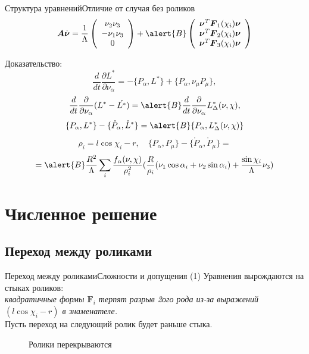 \documentclass{beamer}
\begin{document}
\begin{frame}{Структура уравнений}{Отличие от случая без роликов}    
    $$\boldsymbol{A}\dot{\boldsymbol{\nu}} = \frac1\Lambda
    \left(
    \begin{array}{c}
         \nu_2\nu_3  \\
         -\nu_1\nu_3 \\
         0
    \end{array}
    \right) + \alert{B}
     \left(
    \begin{array}{c}
         \boldsymbol{\nu}^T\boldsymbol{F}_1(\chi_i)\boldsymbol{\nu}  \\
         \boldsymbol{\nu}^T\boldsymbol{F}_2(\chi_i)\boldsymbol{\nu} \\
         \boldsymbol{\nu}^T\boldsymbol{F}_3(\chi_i)\boldsymbol{\nu}
    \end{array}
    \right)
    $$
    
    \textcolor{Periwinkle}{Доказательство:}
  $$ \frac{d}{dt}\frac{\partial L^{*}}{\partial \nu_\alpha} = - \{P_\alpha, L^{*}\} + \{P_\alpha, \nu_\mu P_\mu\},$$
    $$ \frac{d}{dt}\frac{\partial }{\partial \nu_\alpha}(L^{*} - \mathring{L^{*}}) = \alert{B}\frac{d}{dt}\frac{\partial}{\partial \nu_\alpha}L^{*}_\Delta(\nu, \chi), $$
    $$ \{P_\alpha, L^{*}\} - \{\mathring{P}_\alpha, \mathring{L}^{*}\} = \alert{B}\{ P_\alpha, L^{*}_\Delta(\nu, \chi) \} $$
    $$\rho_i = l\cos\chi_i - r, \quad \{P_\alpha, P_\mu\} - \{\mathring{P}_\alpha, \mathring{P}_\mu\}  = $$
    $$ = \alert{B}\frac{R^2}{\Lambda}\sum_i\frac{f_\alpha(\nu, \chi)}{\rho^2_i}(\frac{R}{\rho_i}(\nu_1\cos\alpha_i + \nu_2\sin\alpha_i) + \frac{\sin\chi_i}{\Lambda}\nu_3)$$
\end{frame}

\section{Численное решение}

\subsection{Переход между роликами}

\begin{frame}{Переход между роликами}{Сложности и допущения}
    \textcolor{Periwinkle}{(1) Уравнения вырождаются на стыках роликов:}\\
    \textit{квадратичные формы $\boldsymbol{F}_i$ терпят разрыв 2ого рода из-за выражений $(l\cos\chi_i-r)$ в знаменателе.} \\
    Пусть переход на следующий ролик будет раньше стыка.
    \begin{figure}
        \centering
        \caption{Ролики перекрываются}
    \end{figure}
\end{frame}
\end{document}
